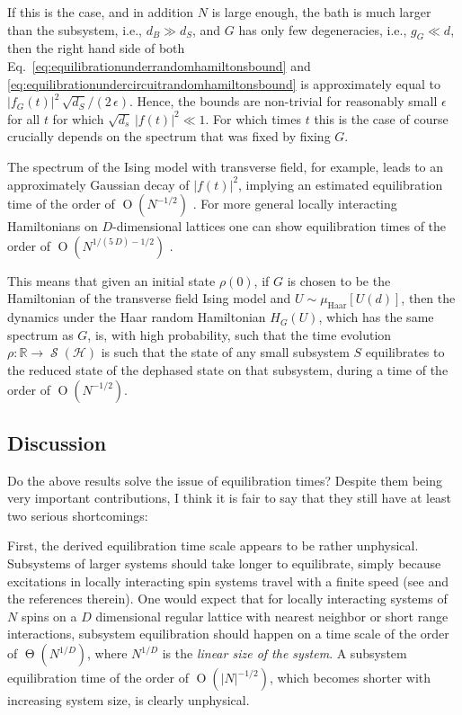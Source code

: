 \documentclass[a4paper,12pt,listof=totoc,index=totoc,bibliography=totoc,headsepline=false,headings=normal,BCOR16.153846mm,DIV12,headinclude,twoside,cleardoublepage=empty,numbers=noenddot,final]{scrreprt}
\theoremstyle{mystyle}
\numberwithin{equation}{section}
\numberwithin{figure}{section}
\numberwithin{lemma}{section}
\numberwithin{theorem}{section}
\numberwithin{corollary}{section}
\numberwithin{definition}{section}
\numberwithin{conjecture}{section}
\numberwithin{observation}{section}
\newcommand{\+}{\mkern2mu}
\newcommand{\texteqref}[1]{Eq.~\eqref{#1}}
\newcommand{\oftype}{\colon}
\renewcommand{\H}{H}
\newcommand{\muhaar}{\mu_{\mathrm{Haar}}}
\DeclareMathOperator{\landauO}{O}
\DeclareMathOperator{\landauTheta}{\Theta}
\DeclareMathOperator{\1}{\mathds{1}}
\DeclareMathOperator{\Qst}{\mathcal{S}}
\newcommand{\mc}[1]{\mathcal{#1}}
\newcommand{\mcH}{\mc{H}}
\newcommand{\mb}[1]{\mathbb{#1}}
\newcommand{\R}{\mb{R}}
\begin{document}
If this is the case, and in addition $N$ is large enough, the bath is much larger than the subsystem, i.e., $d_B \gg d_S$, and $G$ has only few degeneracies, i.e., $g_G \ll d$, then the right hand side of both \texteqref{eq:equilibrationunderrandomhamiltonsbound} and \eqref{eq:equilibrationundercircuitrandomhamiltonsbound} is approximately equal to $|f_G(t)|^2\,\sqrt{d_S}/(2\,\epsilon)$.
Hence, the bounds are non-trivial for reasonably small $\epsilon$ for all $t$ for which $\sqrt{d_s}\,|f(t)|^2 \ll 1$.
For which times $t$ this is the case of course crucially depends on the spectrum that was fixed by fixing $G$.

The spectrum of the Ising model with transverse field, for example, leads to an approximately Gaussian decay of $|f(t)|^2$, implying an estimated equilibration time of the order of $\landauO(N^{-1/2})$ \cite{1108.0374}.
For more general locally interacting Hamiltonians on $D$-dimensional lattices one can show equilibration times of the order of $\landauO(N^{1/(5\,D)-1/2})$ \cite{1112.5295v1}.

This means that given an initial state $\rho(0)$, if $G$ is chosen to be the Hamiltonian of the transverse field Ising model and $U \sim \muhaar[U(d)]$, then the dynamics under the Haar random Hamiltonian $\H_G(U)$, which has the same spectrum as $G$, is, with high probability, such that the time evolution $\rho\oftype\R\to\Qst(\mcH)$ is such that the state of any small subsystem $S$ equilibrates to the reduced state of the dephased state on that subsystem, during a time of the order of $\landauO(N^{-1/2})$.


\subsection*{Discussion}
%
Do the above results solve the issue of equilibration times?
Despite them being very important contributions, I think it is fair to say that they still have at least two serious shortcomings:

First, the derived equilibration time scale appears to be rather unphysical.
Subsystems of larger systems should take longer to equilibrate, simply because excitations in locally interacting spin systems travel with a finite speed (see \cite{Kliesch2013} and the references therein).
One would expect that for locally interacting systems of $N$ spins on a $D$ dimensional regular lattice with nearest neighbor or short range interactions, subsystem equilibration should happen on a time scale of the order of $\landauTheta(N^{1/D})$, where $N^{1/D}$ is the \emph{linear size of the system}.
A subsystem equilibration time of the order of $\landauO(|N|^{-1/2})$, which becomes shorter with increasing system size, is clearly unphysical.
\end{document}
